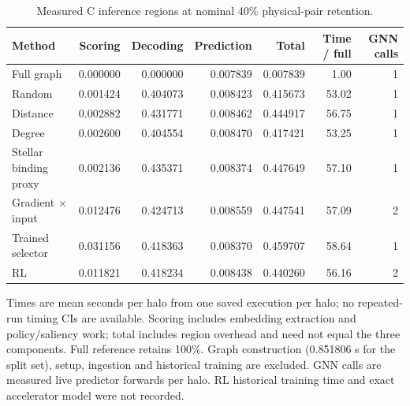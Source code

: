 \begin{table}[t]
\centering
\small
\caption{Measured C inference regions at nominal 40\% physical-pair retention.}
\label{tab:cosmic-4}
\setlength{\tabcolsep}{4pt}
\begin{tabular}{lrrrrrr}
\toprule
Method & Scoring & Decoding & Prediction & Total & Time / full & GNN calls \\
\midrule
Full graph & 0.000000 & 0.000000 & 0.007839 & 0.007839 & 1.00 & 1 \\
Random & 0.001424 & 0.404073 & 0.008423 & 0.415673 & 53.02 & 1 \\
Distance & 0.002882 & 0.431771 & 0.008462 & 0.444917 & 56.75 & 1 \\
Degree & 0.002600 & 0.404554 & 0.008470 & 0.417421 & 53.25 & 1 \\
Stellar binding proxy & 0.002136 & 0.435371 & 0.008374 & 0.447649 & 57.10 & 1 \\
Gradient $\times$ input & 0.012476 & 0.424713 & 0.008559 & 0.447541 & 57.09 & 2 \\
Trained selector & 0.031156 & 0.418363 & 0.008370 & 0.459707 & 58.64 & 1 \\
RL & 0.011821 & 0.418234 & 0.008438 & 0.440260 & 56.16 & 2 \\
\bottomrule
\end{tabular}
\par\smallskip
\begin{minipage}{0.98\textwidth}
\footnotesize Times are mean seconds per halo from one saved execution per halo; no repeated-run timing CIs are available. Scoring includes embedding extraction and policy/saliency work; total includes region overhead and need not equal the three components. Full reference retains 100\%. Graph construction (0.851806 s for the split set), setup, ingestion and historical training are excluded. GNN calls are measured live predictor forwards per halo. RL historical training time and exact accelerator model were not recorded.
\end{minipage}
\end{table}
